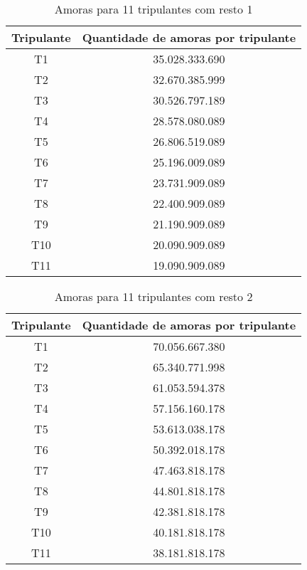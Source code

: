 \documentclass[12pt]{article}
\begin{document}
\begin{table}[H]

\centering

\begin{tabular}{|c|c|}

\hline
Tripulante & Quantidade de amoras por tripulante \\
\hline
T1 & 35.028.333.690 \\
\hline
T2 & 32.670.385.999 \\
\hline
T3 & 30.526.797.189 \\
\hline
T4 & 28.578.080.089 \\
\hline
T5 & 26.806.519.089 \\
\hline
T6 & 25.196.009.089 \\
\hline
T7 & 23.731.909.089 \\
\hline
T8 & 22.400.909.089 \\
\hline
T9 & 21.190.909.089 \\
\hline
T10 & 20.090.909.089 \\
\hline
T11 & 19.090.909.089 \\
\hline

\end{tabular}
\label{Tabela23}
\caption{Amoras para 11 tripulantes com resto 1}

\end{table}

\begin{table}[H]

\centering

\begin{tabular}{|c|c|}

\hline
Tripulante & Quantidade de amoras por tripulante \\
\hline
T1 & 70.056.667.380 \\
\hline
T2 & 65.340.771.998 \\
\hline
T3 & 61.053.594.378 \\
\hline
T4 & 57.156.160.178 \\
\hline
T5 & 53.613.038.178 \\
\hline
T6 & 50.392.018.178 \\
\hline
T7 & 47.463.818.178 \\
\hline
T8 & 44.801.818.178 \\
\hline
T9 & 42.381.818.178 \\
\hline
T10 & 40.181.818.178 \\
\hline
T11 & 38.181.818.178 \\
\hline

\end{tabular}
\label{Tabela24}
\caption{Amoras para 11 tripulantes com resto 2}

\end{table}
\end{document}
